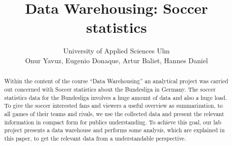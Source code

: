 \documentclass[11pt, journal]{IEEEtran}
\begin{document}
%
\title{Data Warehousing: Soccer statistics 
}
%
%
%

\author{ \parbox{3 in}{\centering  University of Applied Sciences Ulm\\
         {Onur Yavuz, Eugenio Donaque, Artur Baliet, Hannes Daniel}}
}









\maketitle

\begin{abstract}
Within the content of the course “Data Warehousing” an analytical project was carried out concerned with Soccer statistics about the Bundesliga in Germany. The soccer statistics data for the Bundesliga involves a huge amount of data and also a huge load. To give the soccer interested fans and viewers a useful overview as summarization, to all games of their teams and rivals, we use the collected data and present the relevant information in compact form for publics understanding. To achieve this goal, our lab project presents a data warehouse and performs some analysis, which are explained in this paper, to get the relevant data from a understandable perspective.
\end{abstract}
\end{document}
